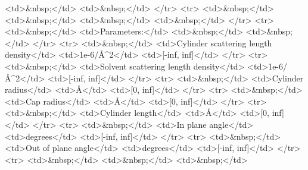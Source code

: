 \textless{}td\textgreater{}\&nbsp;\textless{}/td\textgreater{} \textless{}td\textgreater{}\&nbsp;\textless{}/td\textgreater{} \textless{}/tr\textgreater{} \textless{}tr\textgreater{} \textless{}td\textgreater{}\&nbsp;\textless{}/td\textgreater{} \textless{}td\textgreater{}\&nbsp;\textless{}/td\textgreater{} \textless{}td\textgreater{}\&nbsp;\textless{}/td\textgreater{} \textless{}td\textgreater{}\&nbsp;\textless{}/td\textgreater{} \textless{}/tr\textgreater{} \textless{}tr\textgreater{} \textless{}td\textgreater{}\&nbsp;\textless{}/td\textgreater{} \textless{}td\textgreater{}Parameters:\textless{}/td\textgreater{} \textless{}td\textgreater{}\&nbsp;\textless{}/td\textgreater{} \textless{}td\textgreater{}\&nbsp;\textless{}/td\textgreater{} \textless{}/tr\textgreater{} \textless{}tr\textgreater{} \textless{}td\textgreater{}\&nbsp;\textless{}/td\textgreater{} \textless{}td\textgreater{}Cylinder scattering length density\textless{}/td\textgreater{} \textless{}td\textgreater{}1e-6/\AA{}\textasciicircum{}2\textless{}/td\textgreater{} \textless{}td\textgreater{}[-inf, inf]\textless{}/td\textgreater{} \textless{}/tr\textgreater{} \textless{}tr\textgreater{} \textless{}td\textgreater{}\&nbsp;\textless{}/td\textgreater{} \textless{}td\textgreater{}Solvent scattering length density\textless{}/td\textgreater{} \textless{}td\textgreater{}1e-6/\AA{}\textasciicircum{}2\textless{}/td\textgreater{} \textless{}td\textgreater{}[-inf, inf]\textless{}/td\textgreater{} \textless{}/tr\textgreater{} \textless{}tr\textgreater{} \textless{}td\textgreater{}\&nbsp;\textless{}/td\textgreater{} \textless{}td\textgreater{}Cylinder radius\textless{}/td\textgreater{} \textless{}td\textgreater{}\AA{}\textless{}/td\textgreater{} \textless{}td\textgreater{}[0, inf]\textless{}/td\textgreater{} \textless{}/tr\textgreater{} \textless{}tr\textgreater{} \textless{}td\textgreater{}\&nbsp;\textless{}/td\textgreater{} \textless{}td\textgreater{}Cap radius\textless{}/td\textgreater{} \textless{}td\textgreater{}\AA{}\textless{}/td\textgreater{} \textless{}td\textgreater{}[0, inf]\textless{}/td\textgreater{} \textless{}/tr\textgreater{} \textless{}tr\textgreater{} \textless{}td\textgreater{}\&nbsp;\textless{}/td\textgreater{} \textless{}td\textgreater{}Cylinder length\textless{}/td\textgreater{} \textless{}td\textgreater{}\AA{}\textless{}/td\textgreater{} \textless{}td\textgreater{}[0, inf]\textless{}/td\textgreater{} \textless{}/tr\textgreater{} \textless{}tr\textgreater{} \textless{}td\textgreater{}\&nbsp;\textless{}/td\textgreater{} \textless{}td\textgreater{}In plane angle\textless{}/td\textgreater{} \textless{}td\textgreater{}degrees\textless{}/td\textgreater{} \textless{}td\textgreater{}[-inf, inf]\textless{}/td\textgreater{} \textless{}/tr\textgreater{} \textless{}tr\textgreater{} \textless{}td\textgreater{}\&nbsp;\textless{}/td\textgreater{} \textless{}td\textgreater{}Out of plane angle\textless{}/td\textgreater{} \textless{}td\textgreater{}degrees\textless{}/td\textgreater{} \textless{}td\textgreater{}[-inf, inf]\textless{}/td\textgreater{} \textless{}/tr\textgreater{} \textless{}tr\textgreater{} \textless{}td\textgreater{}\&nbsp;\textless{}/td\textgreater{} \textless{}td\textgreater{}\&nbsp;\textless{}/td\textgreater{} \textless{}td\textgreater{}\&nbsp;\textless{}/td\textgreater{} 